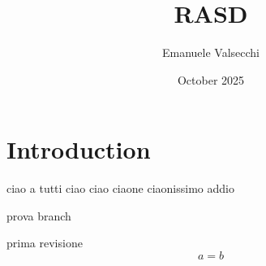\documentclass{article}
\title{RASD}
\author{Emanuele Valsecchi}
\date{October 2025}
\begin{document}
\maketitle

\section{Introduction}

ciao a tutti
ciao ciao
ciaone
ciaonissimo
addio


prova
branch


prima revisione\begin{equation}
    a = b
\end{equation}
\end{document}
